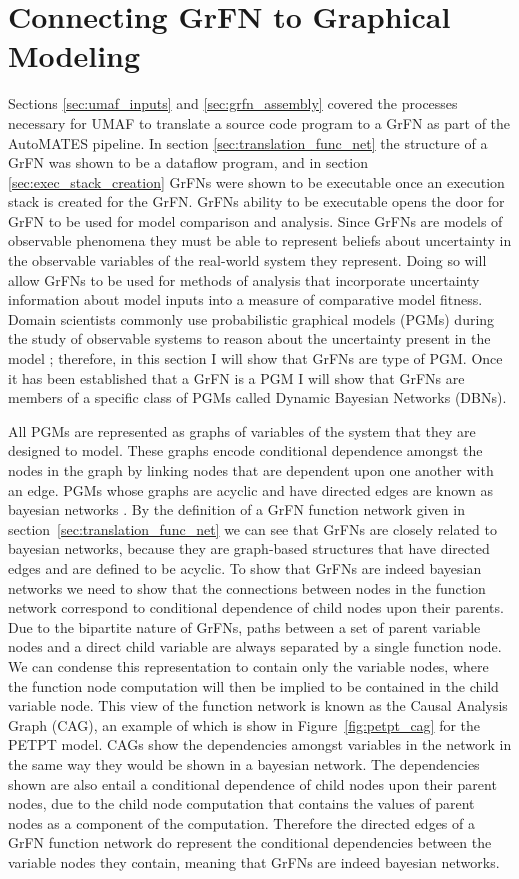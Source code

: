 \section{Connecting GrFN to Graphical Modeling\label{sec:grfns_are_pgms}}
Sections \ref{sec:umaf_inputs} and \ref{sec:grfn_assembly} covered the processes necessary for UMAF to translate a source code program to a GrFN as part of the AutoMATES pipeline.
In section \ref{sec:translation_func_net} the structure of a GrFN was shown to be a dataflow program, and in section \ref{sec:exec_stack_creation} GrFNs were shown to be executable once an execution stack is created for the GrFN.
GrFNs ability to be executable opens the door for GrFN to be used for model comparison and analysis.
Since GrFNs are models of observable phenomena they must be able to represent beliefs about uncertainty in the observable variables of the real-world system they represent.
Doing so will allow GrFNs to be used for methods of analysis that incorporate uncertainty information about model inputs into a measure of comparative model fitness.
Domain scientists commonly use probabilistic graphical models (PGMs) during the study of observable systems to reason about the uncertainty present in the model \citep{pearl2014probabilistic}; therefore, in this section I will show that GrFNs are type of PGM.
Once it has been established that a GrFN is a PGM I will show that GrFNs are members of a specific class of PGMs called Dynamic Bayesian Networks (DBNs).

All PGMs are represented as graphs of variables of the system that they are designed to model.
These graphs encode conditional dependence amongst the nodes in the graph by linking nodes that are dependent upon one another with an edge.
PGMs whose graphs are acyclic and have directed edges are known as bayesian networks \citep{bishop2006pattern}.
By the definition of a GrFN function network given in section~\ref{sec:translation_func_net} we can see that GrFNs are closely related to bayesian networks, because they are graph-based structures that have directed edges and are defined to be acyclic.
To show that GrFNs are indeed bayesian networks we need to show that the connections between nodes in the function network correspond to conditional dependence of child nodes upon their parents.
Due to the bipartite nature of GrFNs, paths between a set of parent variable nodes and a direct child variable are always separated by a single function node.
We can condense this representation to contain only the variable nodes, where the function node computation will then be implied to be contained in the child variable node.
This view of the function network is known as the Causal Analysis Graph (CAG), an example of which is show in Figure~\ref{fig:petpt_cag} for the PETPT model.
CAGs show the dependencies amongst variables in the network in the same way they would be shown in a bayesian network.
The dependencies shown are also entail a conditional dependence of child nodes upon their parent nodes, due to the child node computation that contains the values of parent nodes as a component of the computation.
Therefore the directed edges of a GrFN function network do represent the conditional dependencies between the variable nodes they contain, meaning that GrFNs are indeed bayesian networks.

